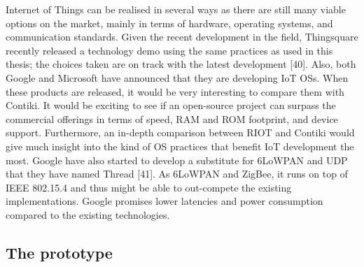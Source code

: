 Internet of Things can be realised in several ways as there are still many viable options on the market,
	mainly in terms of hardware,
	operating systems,
	and communication standards.
Given the recent development in the field,
	Thingsquare recently released a technology demo using the same practices as used in this thesis;
	the choices taken are on track with the latest development [40].
Also,
	both Google and Microsoft have announced that they are developing IoT OSs.
When these products are released,
	it would be very interesting to compare them with Contiki.
It would be exciting to see if an open-source project can surpass the commercial offerings in terms of speed,
	RAM and ROM footprint,
	and device support.
Furthermore,
	an in-depth comparison between RIOT and Contiki would give much insight into the kind of OS practices that benefit IoT development the most.
Google have also started to develop a substitute for 6LoWPAN and UDP that they have named Thread [41].
As 6LoWPAN and ZigBee,
	it runs on top of IEEE 802.15.4 and thus might be able to out-compete the existing implementations.
Google promises lower latencies and power consumption compared to the existing technologies.

\subsection*{The prototype}

